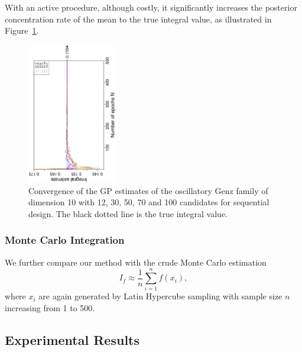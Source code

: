 With an active procedure, although costly, it significantly increases the posterior concentration rate of the mean to the true integral value, as illustrated in Figure~\ref{fig:gpSeqDesign}. 

\begin{figure}[!bt]
    \centering
    \vspace*{-8mm}
    \includegraphics[width = 0.35\textwidth, angle = -90]{../../report/Figures/convergenceMean510DimensionsNoSeqDes.eps}
    \vspace*{-5mm}
    \caption{Convergence of the GP estimates of the oscillatory Genz family of dimension 10 with 12, 30, 50, 70 and 100 candidates for sequential design. The black dotted line is the true integral value.}
    \label{fig:gpSeqDesign}
    \vspace*{-1mm}
\end{figure}

\subsubsection{Monte Carlo Integration}
We further compare our method with the crude Monte Carlo estimation \cite{Press:2007:NRE:1403886}
\begin{equation}
    I_f \approx \frac{1}{n}\sum_{i = 1}^{n} f(x_i),
\end{equation}
where $x_i$ are again generated by Latin Hypercube sampling with sample size $n$ increasing from 1 to 500.

\subsection{Experimental Results}


